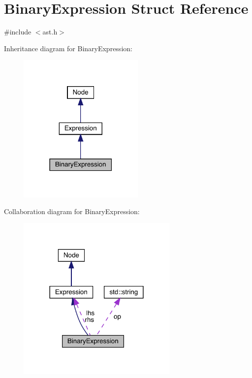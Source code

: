 \hypertarget{struct_binary_expression}{}\section{Binary\+Expression Struct Reference}
\label{struct_binary_expression}


{\ttfamily \#include $<$ast.\+h$>$}



Inheritance diagram for Binary\+Expression\+:
\nopagebreak
\begin{figure}[H]
\begin{center}
\leavevmode
\includegraphics[width=174pt]{struct_binary_expression__inherit__graph}
\end{center}
\end{figure}


Collaboration diagram for Binary\+Expression\+:
\nopagebreak
\begin{figure}[H]
\begin{center}
\leavevmode
\includegraphics[width=222pt]{struct_binary_expression__coll__graph}
\end{center}
\end{figure}
